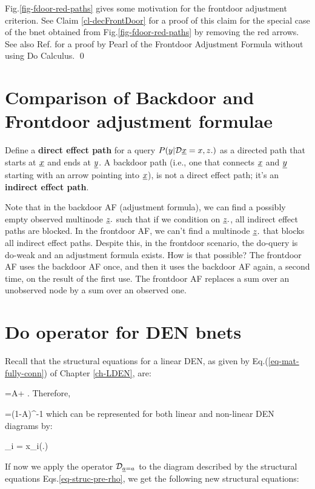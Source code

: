Fig.\ref{fig-fdoor-red-paths}
gives some motivation for the frontdoor adjustment criterion.
See Claim \ref{cl-decFrontDoor}
for a proof of this claim
for the
special case of the bnet obtained from 
Fig.\ref{fig-fdoor-red-paths}
by removing  the red arrows.
See also Ref.\cite{pearl-frontdoor}
for a proof by Pearl
of the Frontdoor Adjustment Formula
without
using Do Calculus.
\qed

\section{Comparison
of Backdoor and Frontdoor
adjustment formulae}

Define a {\bf direct effect path}
for a query $P(y|\cald\rvx=x,z.)$
as a directed path that starts at $\rvx$
and ends
at $\rvy$. A backdoor path
(i.e., one that connects
$\rvx$ and $\rvy$ starting
with an arrow
pointing into $\rvx$),
is not a direct effect path;
it's an {\bf indirect effect path}.

Note that in the backdoor AF (adjustment
formula), we can find a possibly empty
observed multinode
$\rvz.$ such that if
we condition
on $\rvz.$,
all indirect effect paths are blocked.
In the frontdoor AF,
we can't find a multinode $\rvz.$
that blocks all indirect effect
paths.
Despite this,
in the frontdoor scenario,
the do-query is
do-weak and
an adjustment formula
exists.
How is that possible?
The frontdoor AF
uses the backdoor AF once,
and then it uses
the backdoor AF again,
a second time, on
the result of the first use.
The frontdoor AF
replaces a
sum over an unobserved node
by a sum over an observed one.



\section{Do operator for DEN bnets}

Recall that
the structural
equations
for a linear DEN, as
given
by Eq.(\ref{eq-mat-fully-conn})
of Chapter \ref{ch-LDEN}, are:

\beq
\rvx=A\rvx +\rvu
\;.
\label{eq-struc-pre-rho}
\eeq
Therefore,

\beq
\rvx=(1-A)^{-1}\rvu
\eeq
which
can be
represented for
both linear
and non-linear DEN
diagrams by:

\beq
\rvx_i = x_i(\rvu.)
\eeq

If now
we apply the
operator
$\cald_{\rva=a}$
to
the diagram
described by
the structural
equations Eqs.\ref{eq-struc-pre-rho},
we get the following
new
structural
equations:


